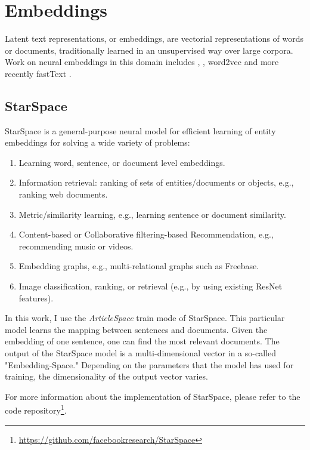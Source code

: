 \section{Embeddings}
\label{Embeddigns}
Latent text representations, or embeddings, are vectorial representations of words or documents, traditionally learned in an unsupervised way over large corpora. Work on neural embeddings in this domain includes \cite{bengioNeuralProbabilisticLanguage2003}, 
\cite{collobertNaturalLanguageProcessing2011}, word2vec \cite{goldbergWord2vecExplainedDeriving2014} and more recently fastText \cite{joulinFastTextZipCompressing2016}.

\subsection{StarSpace}
\label{subsec:StarSpace}
StarSpace \cite{wuStarSpaceEmbedAll2017} is a general-purpose neural model for efficient learning of entity embeddings for solving a wide variety of problems:

\begin{enumerate}
    \item Learning word, sentence, or document level embeddings.
    \item Information retrieval: ranking of sets of entities/documents or objects, e.g., ranking web documents.
    \item Metric/similarity learning, e.g., learning sentence or document similarity.
    \item Content-based or Collaborative filtering-based Recommendation, e.g., recommending music or videos.
    \item Embedding graphs, e.g., multi-relational graphs such as Freebase.
    \item Image classification, ranking, or retrieval (e.g., by using existing ResNet features).
\end{enumerate}

In this work, I use the \emph{ArticleSpace} train mode of StarSpace. This particular model learns the mapping between sentences and documents. Given the embedding of one sentence, one can find the most relevant documents. The output of the StarSpace model is a multi-dimensional vector in a so-called "Embedding-Space." Depending on the parameters that the model has used for training, the dimensionality of the output vector varies. 

For more information about the implementation of StarSpace, please refer to the code repository\footnote{\url{https://github.com/facebookresearch/StarSpace}}.



